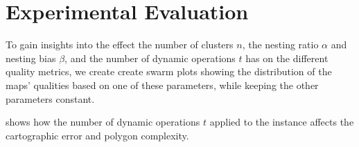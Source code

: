



\section{Experimental Evaluation}
\label{sect:experimental-evaluation}

To gain insights into the effect the number of clusters $n$, the nesting ratio $\alpha$ and nesting bias $\beta$, and the number of dynamic operations $t$ has on the different quality metrics, we create create swarm plots showing the distribution of the maps' qualities based on one of these parameters, while keeping the other parameters constant.

 shows how the number of dynamic operations $t$ applied to the instance affects the cartographic error and polygon complexity.

